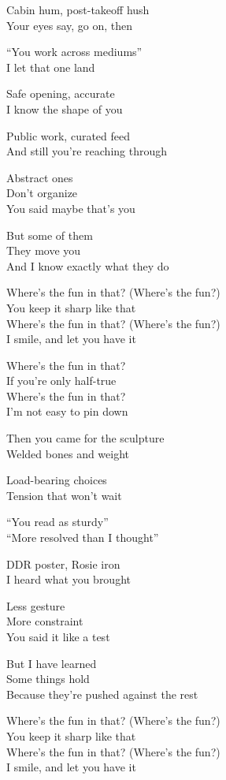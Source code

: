 \begin{lyrics}
Cabin hum, post-takeoff hush\\
Your eyes say, go on, then

“You work across mediums”\\
I let that one land

Safe opening, accurate\\
I know the shape of you

Public work, curated feed\\
And still you’re reaching through

Abstract ones\\
Don’t organize\\
You said maybe that’s you

But some of them\\
They move you\\
And I know exactly what they do

Where’s the fun in that? (Where’s the fun?)\\
You keep it sharp like that\\
Where’s the fun in that? (Where’s the fun?)\\
I smile, and let you have it

Where’s the fun in that?\\
If you’re only half-true\\
Where’s the fun in that?\\
I’m not easy to pin down

Then you came for the sculpture\\
Welded bones and weight

Load-bearing choices\\
Tension that won’t wait

“You read as sturdy”\\
“More resolved than I thought”

DDR poster, Rosie iron\\
I heard what you brought

Less gesture\\
More constraint\\
You said it like a test

But I have learned\\
Some things hold\\
Because they’re pushed against the rest

Where’s the fun in that? (Where’s the fun?)\\
You keep it sharp like that\\
Where’s the fun in that? (Where’s the fun?)\\
I smile, and let you have it


\end{lyrics}

